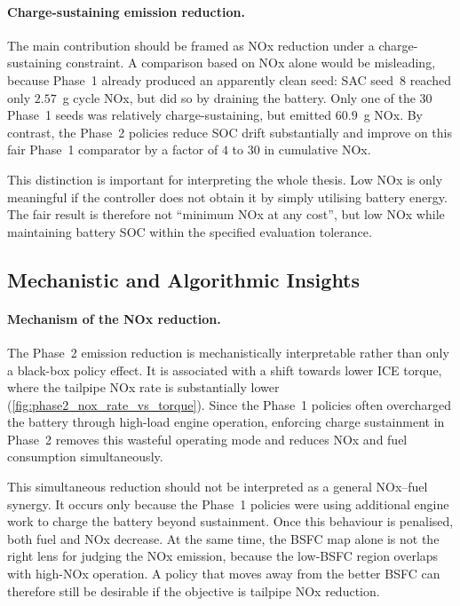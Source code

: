 \paragraph{Charge-sustaining emission reduction.}
The main contribution should be framed as \ac{NOx} reduction under a charge-sustaining constraint. A comparison based on \ac{NOx} alone would be misleading, because Phase~1 already produced an apparently clean seed: SAC seed~8 reached only $2.57$~g cycle \ac{NOx}, but did so by draining the battery. Only one of the 30 Phase~1 seeds was relatively charge-sustaining, but emitted $60.9$~g \ac{NOx}. By contrast, the Phase~2 policies reduce \ac{SOC} drift substantially and improve on this fair Phase~1 comparator by a factor of $4$ to $30$ in cumulative \ac{NOx}.

This distinction is important for interpreting the whole thesis. Low \ac{NOx} is only meaningful if the controller does not obtain it by simply utilising battery energy. The fair result is therefore not ``minimum \ac{NOx} at any cost'', but low \ac{NOx} while maintaining battery \ac{SOC} within the specified evaluation tolerance.

\subsection{Mechanistic and Algorithmic Insights}

\paragraph{Mechanism of the \ac{NOx} reduction.}
The Phase~2 emission reduction is mechanistically interpretable rather than only a black-box policy effect. It is associated with a shift towards lower \ac{ICE} torque, where the tailpipe \ac{NOx} rate is substantially lower (\autoref{fig:phase2_nox_rate_vs_torque}). Since the Phase~1 policies often overcharged the battery through high-load engine operation, enforcing charge sustainment in Phase~2 removes this wasteful operating mode and reduces \ac{NOx} and fuel consumption simultaneously.

This simultaneous reduction should not be interpreted as a general \ac{NOx}--fuel synergy. It occurs only because the Phase~1 policies were using additional engine work to charge the battery beyond sustainment. Once this behaviour is penalised, both fuel and \ac{NOx} decrease. At the same time, the \ac{BSFC} map alone is not the right lens for judging the \ac{NOx} emission, because the low-\ac{BSFC} region overlaps with high-\ac{NOx} operation. A policy that moves away from the better \ac{BSFC} can therefore still be desirable if the objective is tailpipe \ac{NOx} reduction.

